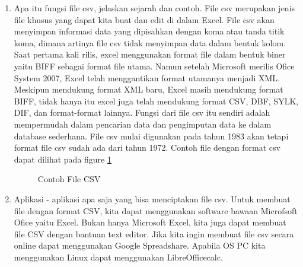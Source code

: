 \begin{enumerate}

\item Apa itu fungsi file csv, jelaskan sejarah dan contoh.
	\subitem File csv merupakan jenis file khusus yang dapat kita buat dan edit di dalam Excel. File csv akan menyimpan informasi data yang dipisahkan dengan koma atau tanda titik koma, dimana artinya file csv tidak menyimpan data dalam bentuk kolom. Saat pertama kali rilis, excel menggunakan format file dalam bentuk biner yaitu BIFF sebagai format file utama. Namun setelah Microsoft merilis Ofice System 2007, Excel telah menggantikan format utamanya menjadi XML. Meskipun mendukung format XML baru, Excel masih mendukung format BIFF, tidak hanya itu excel juga telah mendukung format CSV, DBF, SYLK, DIF, dan format-format lainnya. Fungsi dari file csv itu sendiri adalah mempermudah dalam pencarian data dan pengimputan data ke dalam database sederhana. File csv mulai digunakan pada tahun 1983 akan tetapi format file csv sudah ada dari tahun 1972. Contoh file dengan format csv dapat dilihat pada figure \ref{YNCSV1}

	\begin{figure}[ht]
		\caption{Contoh File CSV}
		\label{YNCSV1}
	\end{figure}

\item Aplikasi - aplikasi apa saja yang bisa menciptakan file csv.
	\subitem Untuk membuat file dengan format CSV, kita dapat menggunakan software bawaan Microfsoft Ofice yaitu Excel. Bukan hanya Microsoft Excel, kita juga dapat membuat file CSV dengan bantuan text editor. Jika kita ingin membuat file csv secara online dapat menggunakan Google Spreadshare. Apabila OS PC kita menggunakan Linux dapat menggunakan LibreOfficecalc.


\end{enumerate}
